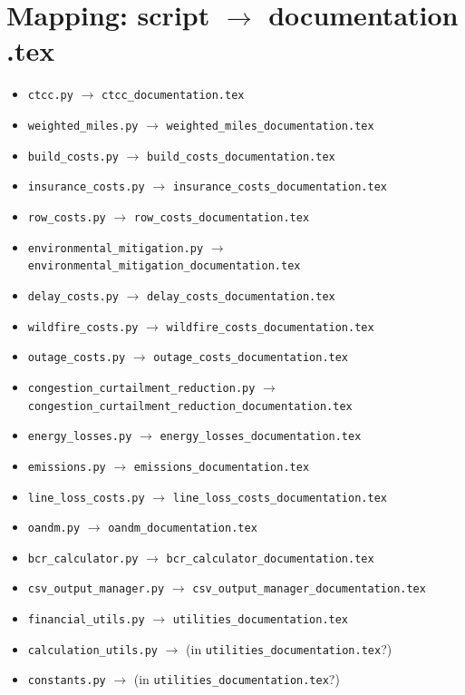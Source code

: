 \documentclass[12pt]{article}
\begin{document}
\section{Mapping: script $\to$ documentation .tex}

\begin{itemize}
  \item \texttt{ctcc.py} $\to$ \texttt{ctcc\_documentation.tex}
  \item \texttt{weighted\_miles.py} $\to$ \texttt{weighted\_miles\_documentation.tex}
  \item \texttt{build\_costs.py} $\to$ \texttt{build\_costs\_documentation.tex}
  \item \texttt{insurance\_costs.py} $\to$ \texttt{insurance\_costs\_documentation.tex}
  \item \texttt{row\_costs.py} $\to$ \texttt{row\_costs\_documentation.tex}
  \item \texttt{environmental\_mitigation.py} $\to$ \texttt{environmental\_mitigation\_documentation.tex}
  \item \texttt{delay\_costs.py} $\to$ \texttt{delay\_costs\_documentation.tex}
  \item \texttt{wildfire\_costs.py} $\to$ \texttt{wildfire\_costs\_documentation.tex}
  \item \texttt{outage\_costs.py} $\to$ \texttt{outage\_costs\_documentation.tex}
  \item \texttt{congestion\_curtailment\_reduction.py} $\to$ \texttt{congestion\_curtailment\_reduction\_documentation.tex}
  \item \texttt{energy\_losses.py} $\to$ \texttt{energy\_losses\_documentation.tex}
  \item \texttt{emissions.py} $\to$ \texttt{emissions\_documentation.tex}
  \item \texttt{line\_loss\_costs.py} $\to$ \texttt{line\_loss\_costs\_documentation.tex}
  \item \texttt{oandm.py} $\to$ \texttt{oandm\_documentation.tex}
  \item \texttt{bcr\_calculator.py} $\to$ \texttt{bcr\_calculator\_documentation.tex}
  \item \texttt{csv\_output\_manager.py} $\to$ \texttt{csv\_output\_manager\_documentation.tex}
  \item \texttt{financial\_utils.py} $\to$ \texttt{utilities\_documentation.tex}
  \item \texttt{calculation\_utils.py} $\to$ (in \texttt{utilities\_documentation.tex}?)
  \item \texttt{constants.py} $\to$ (in \texttt{utilities\_documentation.tex}?)

\end{itemize}
\end{document}
